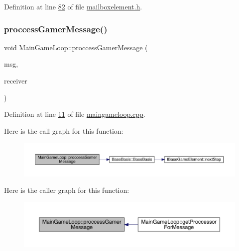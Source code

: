 Definition at line \hyperlink{a00002_source_l00082}{82} of file \hyperlink{a00002_source}{mailboxelement.\+h}.

\mbox{\label{a00209_ac7722494194e946c7d045471858c3aee}} 
\subsubsection{\texorpdfstring{proccess\+Gamer\+Message()}{proccessGamerMessage()}}
{\footnotesize\ttfamily void Main\+Game\+Loop\+::proccess\+Gamer\+Message (\begin{DoxyParamCaption}\item[{\hyperlink{a00201}{Mail\+Receiver\+::mail\+Message} $\ast$}]{msg,  }\item[{\hyperlink{a00205}{Mail\+Sender} $\ast$}]{receiver }\end{DoxyParamCaption})\hspace{0.3cm}{\ttfamily [private]}}



Definition at line \hyperlink{a00089_source_l00011}{11} of file \hyperlink{a00089_source}{maingameloop.\+cpp}.

Here is the call graph for this function\+:
\nopagebreak
\begin{figure}[H]
\begin{center}
\leavevmode
\includegraphics[width=350pt]{d3/de5/a00209_ac7722494194e946c7d045471858c3aee_cgraph}
\end{center}
\end{figure}
Here is the caller graph for this function\+:
\nopagebreak
\begin{figure}[H]
\begin{center}
\leavevmode
\includegraphics[width=350pt]{d3/de5/a00209_ac7722494194e946c7d045471858c3aee_icgraph}
\end{center}
\end{figure}
\mbox{\label{a00209_a26ac1e61f11a51a84b6f2e770808d162}} 
